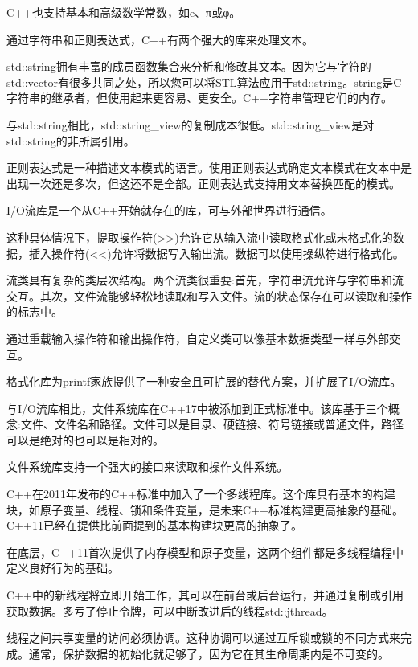C++也支持基本和高级数学常数，如e、π或φ。


通过字符串和正则表达式，C++有两个强大的库来处理文本。

std::string拥有丰富的成员函数集合来分析和修改其文本。因为它与字符的std::vector有很多共同之处，所以您可以将STL算法应用于std::string。string是C字符串的继承者，但使用起来更容易、更安全。C++字符串管理它们的内存。

与std::string相比，std::string\_view的复制成本很低。std::string\_view是对std::string的非所属引用。

正则表达式是一种描述文本模式的语言。使用正则表达式确定文本模式在文本中是出现一次还是多次，但这还不是全部。正则表达式支持用文本替换匹配的模式。


I/O流库是一个从C++开始就存在的库，可与外部世界进行通信。

这种具体情况下，提取操作符(>{}>)允许它从输入流中读取格式化或未格式化的数据，插入操作符(<{}<)允许将数据写入输出流。数据可以使用操纵符进行格式化。

流类具有复杂的类层次结构。两个流类很重要:首先，字符串流允许与字符串和流交互。其次，文件流能够轻松地读取和写入文件。流的状态保存在可以读取和操作的标志中。

通过重载输入操作符和输出操作符，自定义类可以像基本数据类型一样与外部交互。

格式化库为printf家族提供了一种安全且可扩展的替代方案，并扩展了I/O流库。

与I/O流库相比，文件系统库在C++17中被添加到正式标准中。该库基于三个概念:文件、文件名和路径。文件可以是目录、硬链接、符号链接或普通文件，路径可以是绝对的也可以是相对的。

文件系统库支持一个强大的接口来读取和操作文件系统。


C++在2011年发布的C++标准中加入了一个多线程库。这个库具有基本的构建块，如原子变量、线程、锁和条件变量，是未来C++标准构建更高抽象的基础。C++11已经在提供比前面提到的基本构建块更高的抽象了。

在底层，C++11首次提供了内存模型和原子变量，这两个组件都是多线程编程中定义良好行为的基础。

C++中的新线程将立即开始工作，其可以在前台或后台运行，并通过复制或引用获取数据。多亏了停止令牌，可以中断改进后的线程std::jthread。

线程之间共享变量的访问必须协调。这种协调可以通过互斥锁或锁的不同方式来完成。通常，保护数据的初始化就足够了，因为它在其生命周期内是不可变的。

